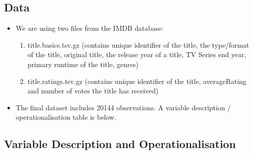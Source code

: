 \documentclass[
]{article}
\providecommand{\tightlist}{%
  \setlength{\itemsep}{0pt}\setlength{\parskip}{0pt}}
\begin{document}
\subsection{Data}\label{data}

\begin{itemize}
\tightlist
\item
  We are using two files from the IMDB database:

  \begin{enumerate}
  \def\labelenumi{\arabic{enumi})}
  \tightlist
  \item
    title.basics.tsv.gz (contains unique identifier of the title, the
    type/format of the title, original title, the release year of a
    title, TV Series end year, primary runtime of the title, genres)
  \item
    title.ratings.tsv.gz (contains unique identifier of the title,
    averageRating and number of votes the title has received)
  \end{enumerate}
\item
  The final dataset includes 20144 observations. A variable description
  / operationalisation table is below.
\end{itemize}

\subsection{Variable Description and
Operationalisation}\label{variable-description-and-operationalisation}
\end{document}

